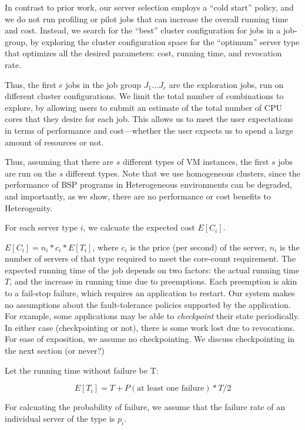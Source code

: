 In contrast to prior work, our server selection employs a ``cold start'' policy, and we do not run profiling or pilot jobs that can increase the overall running time and cost.
Instead, we search for the ``best'' cluster configuration for jobs in a job-group, by exploring the cluster configuration space for the ``optimum'' server type that optimizes all the desired parameters: cost, running time, and revocation rate.


Thus, the first $e$ jobs in the job group $J_1\ldots J_e$ are the exploration jobs, run on different cluster configurations.
We limit the total number of combinations to explore, by allowing users to submit an estimate of the total number of CPU cores that they desire for each job.
This allows us to meet the user expectations in terms of performance and cost---whether the user expects us to spend a large amount of resources or not.

Thus, assuming that there are $s$ different types of VM instances, the first $s$ jobs are run on the $s$ different types.
Note that we use homogeneous clusters, since the performance of BSP programs in Heterogeneous environments can be degraded, and importantly, as we show, there are no performance or cost benefits to Heterogenity. 


For each server type $i$, we calcuate the expected cost $E[C_i]$.

$E[C_i] = n_i*c_i * E[T_i]$, where $c_i$ is the price (per second) of the server, $n_i$ is the number of servers of that type required to meet the core-count requirement.
The expected running time of the job depends on two factors: the actual running time $T$, and the increase in running time due to preemptions.
Each preemption is akin to a fail-stop failure, which requires an application to restart.
Our system makes no assumptions about the fault-tolerance policies supported by the application. For example, some applications may be able to \emph{checkpoint} their state periodically.
In either case (checkpointing or not), there is some work lost due to revocations.
For ease of exposition, we assume no checkpointing. We discuss checkpointing in the next section (or never?)


Let the running time without failure be T:

\begin{equation}
  \label{eq:et1}
E[T_i] = T + P(\text{at least one failure})*T/2   
\end{equation}

For calcuating the probability of failure, we assume that the failure rate of an individual server of the type is $p_i$. 

